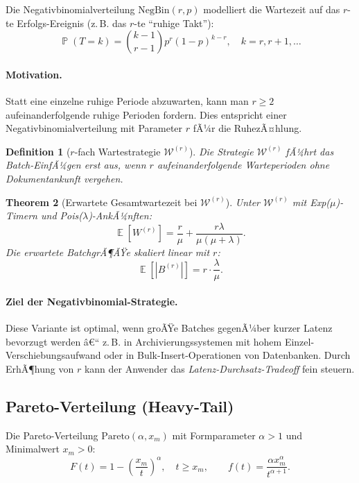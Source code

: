 ﻿\documentclass[12pt, a4paper]{article}
\newtheorem{theorem}{Theorem}[section]
\newtheorem{definition}[theorem]{Definition}
\DeclareMathOperator{\E}{\mathbb{E}}
\DeclareMathOperator{\Prob}{\mathbb{P}}
\newcommand{\NBin}{\mathrm{NegBin}}
\newcommand{\Pareto}{\mathrm{Pareto}}
\begin{document}
Die Negativbinomialverteilung $\NBin(r, p)$ modelliert die Wartezeit auf das
$r$-te Erfolgs-Ereignis (z.\,B. das $r$-te ``ruhige Takt''):
\[
  \Prob(T = k) = \binom{k-1}{r-1} p^r (1-p)^{k-r}, \quad k = r, r+1, \ldots
\]

\paragraph{Motivation.}
Statt eine einzelne ruhige Periode abzuwarten, kann man $r \geq 2$ aufeinanderfolgende
ruhige Perioden fordern. Dies entspricht einer Negativbinomialverteilung mit
Parameter $r$ fÃ¼r die RuhezÃ¤hlung.

\begin{definition}[$r$-fach Wartestrategie $\mathcal{W}^{(r)}$]
Die Strategie $\mathcal{W}^{(r)}$ fÃ¼hrt das Batch-EinfÃ¼gen erst aus, wenn
$r$ aufeinanderfolgende Warteperioden ohne Dokumentankunft vergehen.
\end{definition}

\begin{theorem}[Erwartete Gesamtwartezeit bei $\mathcal{W}^{(r)}$]
\label{thm:negbin}
Unter $\mathcal{W}^{(r)}$ mit Exp($\mu$)-Timern und Pois($\lambda$)-AnkÃ¼nften:
\[
  \E[W^{(r)}] = \frac{r}{\mu} + \frac{r\lambda}{\mu(\mu+\lambda)}.
\]
Die erwartete BatchgrÃ¶ÃŸe skaliert linear mit $r$:
\[
  \E[|B^{(r)}|] = r \cdot \frac{\lambda}{\mu}.
\]
\end{theorem}

\paragraph{Ziel der Negativbinomial-Strategie.}
Diese Variante ist optimal, wenn groÃŸe Batches gegenÃ¼ber kurzer Latenz
bevorzugt werden â€“ z.\,B. in Archivierungssystemen mit hohem Einzel-
Verschiebungsaufwand oder in Bulk-Insert-Operationen von Datenbanken.
Durch ErhÃ¶hung von $r$ kann der Anwender das \emph{Latenz-Durchsatz-Tradeoff}
fein steuern.

\subsection{Pareto-Verteilung (Heavy-Tail)}\label{subsec:pareto}

Die Pareto-Verteilung $\Pareto(\alpha, x_m)$ mit Formparameter $\alpha > 1$
und Minimalwert $x_m > 0$:
\[
  F(t) = 1 - \left(\frac{x_m}{t}\right)^\alpha, \quad t \geq x_m,
  \qquad
  f(t) = \frac{\alpha x_m^\alpha}{t^{\alpha+1}}.
\]
\end{document}
